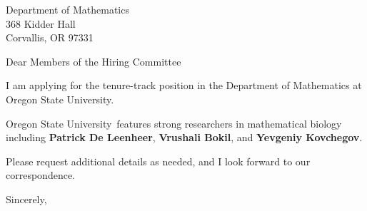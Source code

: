 




	
	
	\def\School{Oregon State University}
	
	\begin{letter}
		{Department of Mathematics\\
			368 Kidder Hall\\
			Corvallis, OR 97331
		}
		
		\opening{Dear Members of the Hiring Committee}
		
		
		I am applying for the tenure-track position in the Department of Mathematics at \School. 
		
		
		
		\School~features strong researchers in mathematical biology including \textbf{Patrick De Leenheer}, \textbf{Vrushali Bokil}, and \textbf{Yevgeniy Kovchegov}. 
		
		
		
		
		
		Please request additional details as needed, and I look forward to our correspondence.
		
		\closing{Sincerely,}
	\end{letter}
